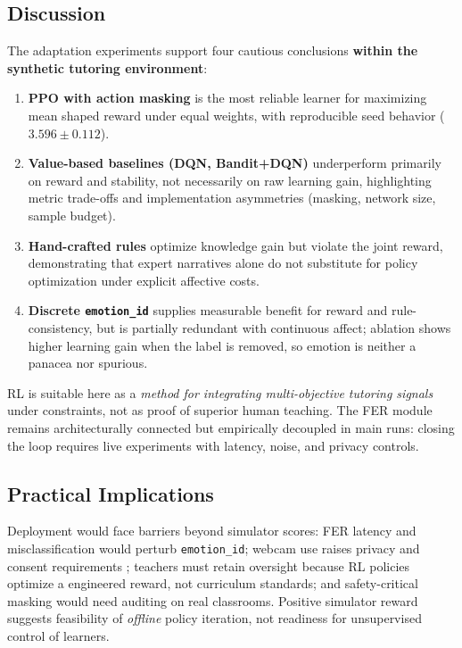 \subsection{Discussion}\label{sec:results_adapt_discussion}

The adaptation experiments support four cautious conclusions \textbf{within the synthetic tutoring environment}:

\begin{enumerate}
    \item \textbf{PPO with action masking} is the most reliable learner for maximizing mean shaped reward under equal weights, with reproducible seed behavior ($3.596 \pm 0.112$).
    \item \textbf{Value-based baselines (DQN, Bandit+DQN)} underperform primarily on reward and stability, not necessarily on raw learning gain, highlighting metric trade-offs and implementation asymmetries (masking, network size, sample budget).
    \item \textbf{Hand-crafted rules} optimize knowledge gain but violate the joint reward, demonstrating that expert narratives alone do not substitute for policy optimization under explicit affective costs.
    \item \textbf{Discrete \texttt{emotion\_id}} supplies measurable benefit for reward and rule-consistency, but is partially redundant with continuous affect; ablation shows higher learning gain when the label is removed, so emotion is neither a panacea nor spurious.
\end{enumerate}

RL is suitable here as a \emph{method for integrating multi-objective tutoring signals} under constraints, not as proof of superior human teaching. The FER module remains architecturally connected but empirically decoupled in main runs: closing the loop requires live experiments with latency, noise, and privacy controls.

\subsection{Practical Implications}\label{sec:results_adapt_practical}

Deployment would face barriers beyond simulator scores: FER latency and misclassification would perturb \texttt{emotion\_id}; webcam use raises privacy and consent requirements \cite{fernandez-herrero_evaluating_2024,vistorte_integrating_2024}; teachers must retain oversight because RL policies optimize a engineered reward, not curriculum standards; and safety-critical masking would need auditing on real classrooms. Positive simulator reward suggests feasibility of \emph{offline} policy iteration, not readiness for unsupervised control of learners.

